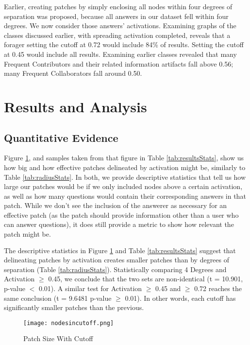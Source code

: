 Earlier, creating patches by simply enclosing all nodes within four degrees of separation was proposed, because all answers in our dataset fell within four degrees. We now consider those answers' activations. Examining graphs of the classes discussed earlier, with spreading activation completed, reveals that a forager setting the cutoff at 0.72 would include 84\% of results. Setting the cutoff at 0.45 would include all results. Examining earlier classes revealed that many Frequent Contributors and their related information artifacts fall above 0.56; many Frequent Collaborators fall around 0.50.

\section{Results and Analysis}
\subsection{Quantitative Evidence}
Figure \ref{fig:resultsStats}, and samples taken from that figure in Table \ref{tab:resultsStats}, show us how big and how effective patches delineated by activation might be, similarly to Table \ref{tab:radiusStats}. In both, we provide descriptive statistics that tell us how large our patches would be if we only included nodes above a certain activation, as well as how many questions would contain their corresponding answers in that patch. While we don't see the inclusion of the answerer as necessary for an effective patch (as the patch should provide information other than a user who can answer questions), it does still provide a metric to show how relevant the patch might be.

The descriptive statistics in Figure \ref{fig:resultsStats} and Table \ref{tab:resultsStats} suggest that delineating patches by activation creates smaller patches than by degrees of separation (Table \ref{tab:radiusStats}). Statistically comparing 4 Degrees and Activation $\geq$ 0.45, we conclude that the two sets are non-identical (t = 10.901, p-value $<$ 0.01). A similar test for Activation $\geq$ 0.45 and $\geq$ 0.72 reaches the same conclusion (t = 9.6481 p-value $\geq$ 0.01). In other words, each cutoff has significantly smaller patches than the previous. 

\begin{figure}[ht]
	\centering
	\texttt{[image: nodesincutoff.png]}
	\caption{Patch Size With Cutoff}
	\label{fig:resultsStats}
\end{figure}

